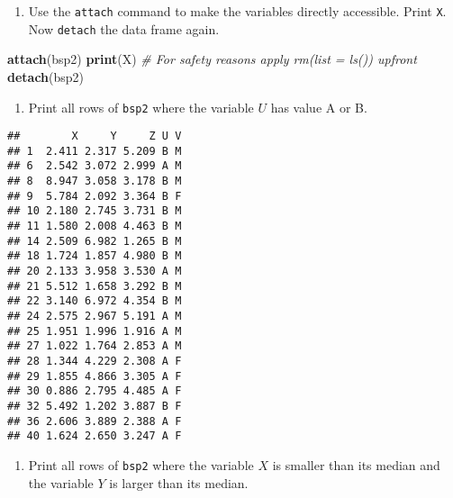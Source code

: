 \documentclass[]{article}
\newenvironment{Shaded}{\begin{snugshade}}{\end{snugshade}}
\newcommand{\KeywordTok}[1]{\textcolor[rgb]{0.13,0.29,0.53}{\textbf{#1}}}
\newcommand{\StringTok}[1]{\textcolor[rgb]{0.31,0.60,0.02}{#1}}
\newcommand{\CommentTok}[1]{\textcolor[rgb]{0.56,0.35,0.01}{\textit{#1}}}
\newcommand{\OperatorTok}[1]{\textcolor[rgb]{0.81,0.36,0.00}{\textbf{#1}}}
\newcommand{\NormalTok}[1]{#1}
\providecommand{\tightlist}{%
  \setlength{\itemsep}{0pt}\setlength{\parskip}{0pt}}
\begin{document}
\begin{enumerate}
\def\labelenumi{\arabic{enumi}.}
\setcounter{enumi}{2}
\tightlist
\item
  Use the \texttt{attach} command to make the variables directly
  accessible. Print \texttt{X}. Now \texttt{detach} the data frame
  again.
\end{enumerate}

\begin{Shaded}
\begin{Highlighting}[]
\KeywordTok{attach}\NormalTok{(bsp2)}
\KeywordTok{print}\NormalTok{(X)  }\CommentTok{# For safety reasons apply rm(list = ls()) upfront}
\KeywordTok{detach}\NormalTok{(bsp2)}
\end{Highlighting}
\end{Shaded}

\begin{enumerate}
\def\labelenumi{\arabic{enumi}.}
\setcounter{enumi}{3}
\tightlist
\item
  Print all rows of \texttt{bsp2} where the variable \(U\) has value A
  or B.
\end{enumerate}

\begin{Shaded}
\end{Shaded}

\begin{verbatim}
##        X     Y     Z U V
## 1  2.411 2.317 5.209 B M
## 6  2.542 3.072 2.999 A M
## 8  8.947 3.058 3.178 B M
## 9  5.784 2.092 3.364 B F
## 10 2.180 2.745 3.731 B M
## 11 1.580 2.008 4.463 B M
## 14 2.509 6.982 1.265 B M
## 18 1.724 1.857 4.980 B M
## 20 2.133 3.958 3.530 A M
## 21 5.512 1.658 3.292 B M
## 22 3.140 6.972 4.354 B M
## 24 2.575 2.967 5.191 A M
## 25 1.951 1.996 1.916 A M
## 27 1.022 1.764 2.853 A M
## 28 1.344 4.229 2.308 A F
## 29 1.855 4.866 3.305 A F
## 30 0.886 2.795 4.485 A F
## 32 5.492 1.202 3.887 B F
## 36 2.606 3.889 2.388 A F
## 40 1.624 2.650 3.247 A F
\end{verbatim}

\begin{enumerate}
\def\labelenumi{\arabic{enumi}.}
\setcounter{enumi}{4}
\tightlist
\item
  Print all rows of \texttt{bsp2} where the variable \(X\) is smaller
  than its median and the variable \(Y\) is larger than its median.
\end{enumerate}
\end{document}
